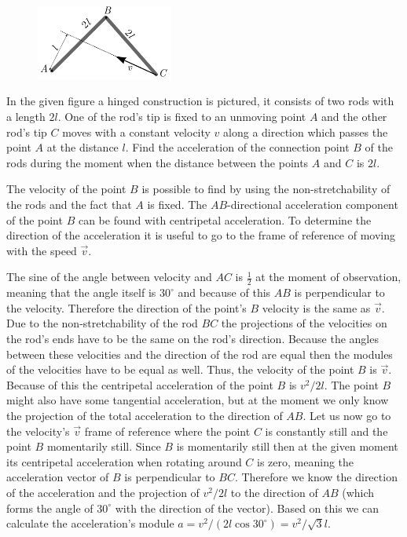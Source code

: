 {\ifEngStatement
\begin{figure}
	\vspace{-10pt}
	\includegraphics[width = 0.4\textwidth]  {2017-lahg-10-delta.pdf}
\end{figure}
In the given figure a hinged construction is pictured, it consists of two rods with a length $2l$. One of the rod’s tip is fixed to an unmoving point $A$ and the other rod’s tip $C$ moves with a constant velocity $v$ along a direction which passes the point $A$ at the distance $l$. Find the acceleration of the connection point $B$ of the rods during the moment when the distance between the points $A$ and $C$ is $2l$.
\fi


\ifEngHint
The velocity of the point $B$ is possible to find by using the non-stretchability of the rods and the fact that $A$ is fixed. The $AB$-directional acceleration component of the point $B$ can be found with centripetal acceleration. To determine the direction of the acceleration it is useful to go to the frame of reference of moving with the speed $\vec{v}$.
\fi


\ifEngSolution
The sine of the angle between velocity and $AC$ is $\frac 12$ at the moment of observation, meaning that the angle itself is $30^\circ$ and because of this $AB$ is perpendicular to the velocity. Therefore the direction of the point’s $B$ velocity is the same as $\vec v$. Due to the non-stretchability of the rod $BC$ the projections of the velocities on the rod’s ends have to be the same on the rod’s direction. Because the angles between these velocities and the direction of the rod are equal then the modules of the velocities have to be equal as well. Thus, the velocity of the point $B$ is $\vec v$. Because of this the centripetal acceleration of the point $B$ is $v^2/2l$. The point $B$ might also have some tangential acceleration, but at the moment we only know the projection of the total acceleration to the direction of $AB$. Let us now go to the velocity’s $\vec v$ frame of reference where the point $C$ is constantly still and the point $B$ momentarily still. Since $B$ is momentarily still then at the given moment its centripetal acceleration when rotating around $C$ is zero, meaning the acceleration vector of $B$ is perpendicular to $BC$. Therefore we know the direction of the acceleration and the projection of $v^2/2l$ to the direction of $AB$ (which forms the angle of $30^\circ$ with the direction of the vector). Based on this we can calculate the acceleration’s module $a=v^2/(2l\cos30^\circ)=v^2/\sqrt 3l$.
\fi
}